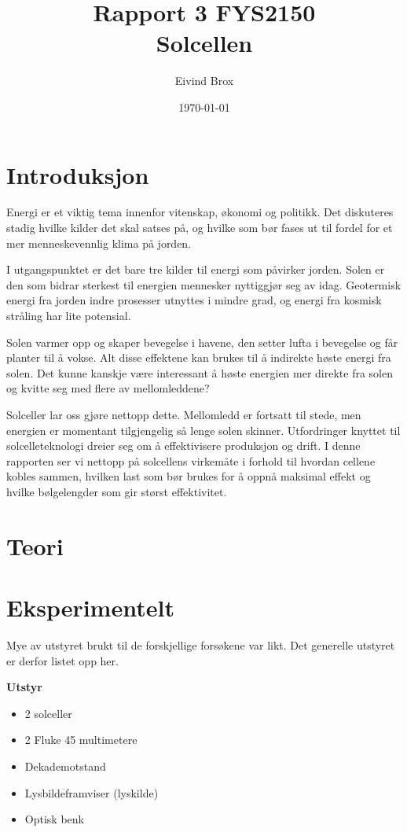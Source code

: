 \documentclass[a4paper,11pt, twocolumn]{article}
\title{Rapport 3 FYS2150\\Solcellen}
\author{Eivind Brox}
\date{\today}
\begin{document}
\maketitle
\listoftodos
\begin{abstract}

\end{abstract}

\section{Introduksjon}
Energi er et viktig tema innenfor vitenskap, økonomi og politikk. Det diskuteres stadig hvilke kilder det skal satses på, og hvilke som bør fases ut til fordel for et mer menneskevennlig klima på jorden. 

I utgangspunktet er det bare tre kilder til energi som påvirker jorden. Solen er den som bidrar sterkest til energien mennesker nyttiggjør seg av idag. Geotermisk energi fra jorden indre prosesser utnyttes i mindre grad, og energi fra kosmisk stråling har lite potensial.

Solen varmer opp og skaper bevegelse i havene, den setter lufta i bevegelse og får planter til å vokse. Alt disse effektene kan brukes til å indirekte høste energi fra solen. Det kunne kanskje være interessant å høste energien mer direkte fra solen og kvitte seg med flere av mellomleddene?

Solceller lar oss gjøre nettopp dette. Mellomledd er fortsatt til stede, men energien er momentant tilgjengelig så lenge solen skinner. Utfordringer knyttet til solcelleteknologi dreier seg om å effektivisere produksjon og drift. I denne rapporten ser vi nettopp på solcellens virkemåte i forhold til hvordan cellene kobles sammen, hvilken last som bør brukes for å oppnå maksimal effekt og hvilke bølgelengder som gir størst effektivitet.   
\section{Teori}
\section{Eksperimentelt}
Mye av utstyret brukt til de forskjellige forsøkene var likt. Det generelle utstyret er derfor listet opp her.

{\bf Utstyr}
\begin{itemize}
	\item 2 solceller
	\item 2 Fluke 45 multimetere
	\item Dekademotstand
	\item Lysbildeframviser (lyskilde)
	\item Optisk benk
\end{itemize}
\end{document}

